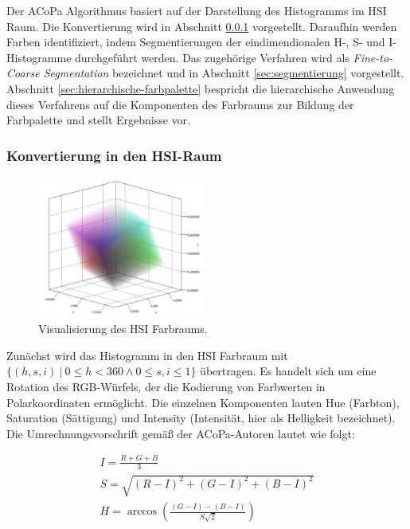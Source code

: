 Der ACoPa Algorithmus \citep{acopa} basiert auf der Darstellung des Histogramms im HSI Raum. Die Konvertierung wird in Abschnitt \ref{sec:hsi-raum} vorgestellt. Daraufhin werden Farben identifiziert, indem Segmentierungen der eindimendionalen H-, S- und I-Histogramme durchgeführt werden. Das zugehörige Verfahren wird als \emph{Fine-to-Coarse Segmentation} bezeichnet und in Abschnitt \ref{sec:segmentierung} vorgestellt. Abschnitt \ref{sec:hierarchische-farbpalette} bespricht die hierarchische Anwendung dieses Verfahrens auf die Komponenten des Farbraums zur Bildung der Farbpalette und stellt Ergebnisse vor.

\subsubsection{Konvertierung in den HSI-Raum}
\label{sec:hsi-raum}

\begin{figure}
\centering
\includegraphics[width=0.5\textwidth]{img/hsi_conversion.png}
\caption{Visualisierung des HSI Farbraums.}
\label{fig:hsi_conversion}
\end{figure}


Zunächst wird das Histogramm in den HSI Farbraum mit $\{(h, s, i) \ | \ 0 \leq h < 360 \wedge 0 \leq s, i \leq 1\}$ übertragen. Es handelt sich um eine Rotation des RGB-Würfels, der die Kodierung von Farbwerten in Polarkoordinaten ermöglicht. Die einzelnen Komponenten lauten Hue (Farbton), Saturation (Sättigung) und Intensity (Intensität, hier als Helligkeit bezeichnet). Die Umrechnungsvorschrift gemäß der ACoPa-Autoren lautet wie folgt:

\begin{equation}
\begin{split}
I = \frac{R+G+B}{3} \\
S = \sqrt{(R-I)^2 + (G-I)^2 + (B-I)^2} \\  
H = \arccos{(\frac{(G-I)-(B-I)}{S\sqrt{2}})}
\end{split}
\label{eq:hsi_acopa}
\end{equation}


